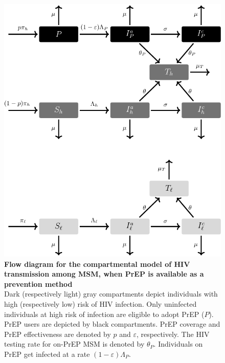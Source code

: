 \documentclass[12pt]{article}
\begin{document}
\newpage
\begin{figure}[H]
	\centering
	\includegraphics[width=12 cm]{Figures/Fig_S2}
	\caption[Flow diagram for the compartmental model of HIV transmission among MSM, when PrEP is available as a prevention method]{%
		\textbf{Flow diagram for the compartmental model of HIV transmission among MSM, when PrEP is available as a prevention method}\\
	Dark (respectively light) gray compartments depict individuals with high (respectively low) risk of HIV infection. Only uninfected individuals at high risk of infection are eligible to adopt PrEP ($P$). PrEP users are depicted by black compartments. PrEP coverage and PrEP effectiveness are denoted by $p$ and $\varepsilon$, respectively. The HIV testing rate for on-PrEP MSM is denoted by $\theta_P$. Individuals on PrEP get infected at a rate $(1-\varepsilon) \Lambda_P$.}
	\label{fig:FlowDiagP}
\end{figure}
 
\end{document}

